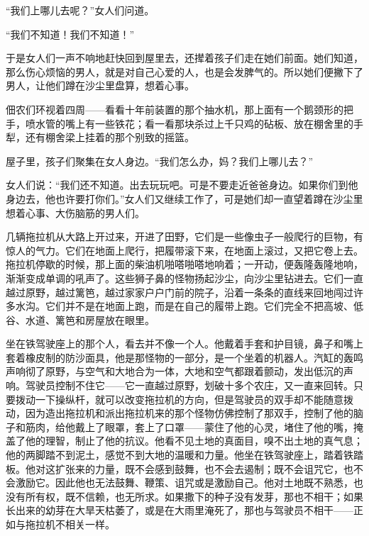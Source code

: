 \documentclass[12pt,UTF-8,openany]{ctexbook}
\begin{document}
\begin{normalsize}
    “我们上哪儿去呢？”女人们问道。
    
    “我们不知道！我们不知道！”
    
    于是女人们一声不响地赶快回到屋里去，还撵着孩子们走在她们前面。她们知道，那么伤心烦恼的男人，就是对自己心爱的人，也是会发脾气的。所以她们便撇下了男人，让他们蹲在沙尘里盘算，想着心事。
    
    佃农们环视着四周——看看十年前装置的那个抽水机，那上面有一个鹅颈形的把手，喷水管的嘴上有一些铁花；看一看那块杀过上千只鸡的砧板、放在棚舍里的手犁，还有棚舍梁上挂着的那个别致的摇篮。
    
    屋子里，孩子们聚集在女人身边。“我们怎么办，妈？我们上哪儿去？”
    
    女人们说：“我们还不知道。出去玩玩吧。可是不要走近爸爸身边。如果你们到他身边去，他也许要打你们。”女人们又继续工作了，可是她们却一直望着蹲在沙尘里想着心事、大伤脑筋的男人们。
    
    几辆拖拉机从大路上开过来，开进了田野，它们是一些像虫子一般爬行的巨物，有惊人的气力。它们在地面上爬行，把履带滚下来，在地面上滚过，又把它卷上去。拖拉机停歇的时候，那上面的柴油机啪嗒啪嗒地响着；一开动，便轰隆轰隆地响，渐渐变成单调的吼声了。这些狮子鼻的怪物扬起沙尘，向沙尘里钻进去。它们一直越过原野，越过篱笆，越过家家户户门前的院子，沿着一条条的直线来回地闯过许多水沟。它们并不是在地面上跑，而是在自己的履带上跑。它们完全不把高坡、低谷、水道、篱笆和房屋放在眼里。
    
    坐在铁驾驶座上的那个人，看去并不像一个人。他戴着手套和护目镜，鼻子和嘴上套着橡皮制的防沙面具，他是那怪物的一部分，是一个坐着的机器人。汽缸的轰鸣声响彻了原野，与空气和大地合为一体，大地和空气都跟着颤动，发出低沉的声响。驾驶员控制不住它——它一直越过原野，划破十多个农庄，又一直来回转。只要拨动一下操纵杆，就可以改变拖拉机的方向，但是驾驶员的双手却不能随意拨动，因为造出拖拉机和派出拖拉机来的那个怪物仿佛控制了那双手，控制了他的脑子和筋肉，给他戴上了眼罩，套上了口罩——蒙住了他的心灵，堵住了他的嘴，掩盖了他的理智，制止了他的抗议。他看不见土地的真面目，嗅不出土地的真气息；他的两脚踏不到泥土，感觉不到大地的温暖和力量。他坐在铁驾驶座上，踏着铁踏板。他对这扩张来的力量，既不会感到鼓舞，也不会去遏制；既不会诅咒它，也不会激励它。因此他也无法鼓舞、鞭策、诅咒或是激励自己。他对土地既不熟悉，也没有所有权，既不信赖，也无所求。如果撒下的种子没有发芽，那也不相干；如果长出来的幼芽在大旱天枯萎了，或是在大雨里淹死了，那也与驾驶员不相干——正如与拖拉机不相关一样。
    

\end{normalsize}
\end{document}
